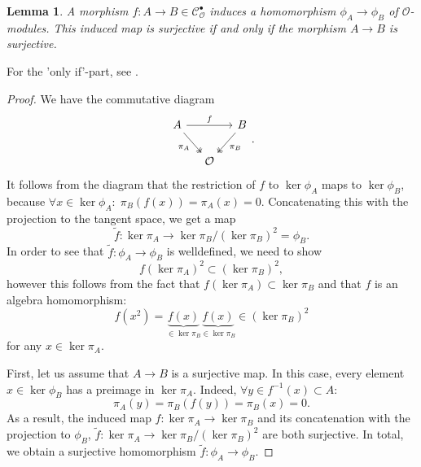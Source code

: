 \documentclass{article}
\theoremstyle{plain}%
\newtheorem{lemma}[theorem]{Lemma}
\theoremstyle{definition}
\theoremstyle{remark}
\newcommand{\cob}{\mathcal{C}_\mathcal{O}^\bullet}
\begin{document}
\begin{lemma}\label{lem:surjectivity_phi}
    A morphism \(f\colon A \to B \in \cob\) induces a homomorphism \(\phi_A \to \phi_B\) of \(\mathcal{O}\)-modules.
    This induced map is surjective if and only if the morphism \(A \to B\) is surjective.
\end{lemma}
For the 'only if'-part, see \cites[lemma 5.5]{Darmon1995}[theorem 8.4]{Matsumura1986}%
[ch. II, lemma 7.4]{Hartshorne1977}[\href{https://stacks.math.columbia.edu/tag/090T}{Tag 090T}]{stacks-project}.
\begin{proof}
    We have the commutative diagram
    \[
    \begin{tikzcd}[column sep=small]
        A \arrow[rr, "f"] \arrow [dr, "\pi_A", swap, twoheadrightarrow] & & B \arrow [dl, "\pi_B", twoheadrightarrow]\\
        & \mathcal{O} &
    \end{tikzcd}.
    \]
    It follows from the diagram that the restriction of \(f\) to \(\ker \phi_A\) maps to \(\ker \phi_B\),
    because \(\forall x \in \ker \phi_A\colon\; \pi_B(f(x)) = \pi_A(x) = 0\).
    Concatenating this with the projection to the tangent space, we get a map
    \[
        \tilde f\colon \ker \pi_A \to \ker \pi_B/(\ker \pi_B)^2 = \phi_B.
    \]
    In order to see that \(\tilde f\colon \phi_A \to \phi_B\) is welldefined, we need to show 
    \[
        f(\ker \pi_A)^2 \subset (\ker \pi_B)^2,
    \]
    however this follows from the fact that \(f(\ker \pi_A) \subset \ker \pi_B\) and that \(f\) is an algebra
    homomorphism:
    \[
        f(x^2) = \underbrace{f(x)}_{\in \ker \pi_B}\underbrace{f(x)}_{\in \ker \pi_B} \in (\ker \pi_B)^2 
    \]
    for any \(x \in \ker \pi_A\).

    First, let us assume that \(A \to B\) is a surjective map.
    In this case, every element \(x \in \ker \phi_B\) has a preimage in \(\ker \pi_A\). 
    Indeed, \(\forall y \in f^{-1}(x)\subset A\colon\)
    \[
        \pi_A(y) = \pi_B(f(y)) = \pi_B(x) = 0.
    \]
    As a result, the induced map \(f\colon \ker \pi_A \to \ker \pi_B\) and its concatenation with
    the projection to \(\phi_B\), \(\tilde f\colon \ker \pi_A \to \ker \pi_B/(\ker \pi_B)^2\) are both surjective.
    In total, we obtain a surjective homomorphism \(\tilde f\colon \phi_A \to \phi_B\).
    

\end{proof}
\end{document}
